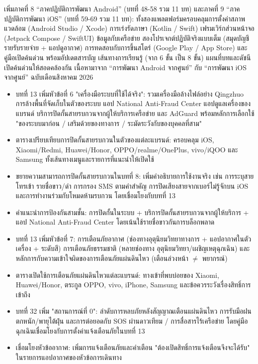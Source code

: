 เพิ่มภาคที่ 8 “ภาคปฏิบัติการพัฒนา Android” (บทที่ 48-58 รวม 11 บท) และภาคที่ 9 “ภาคปฏิบัติการพัฒนา iOS” (บทที่ 59-69 รวม 11 บท): ทั้งสองแพลตฟอร์มครอบคลุมการตั้งค่าสภาพแวดล้อม (Android Studio / Xcode) การเร่งรัดภาษา (Kotlin / Swift) เฟรมเวิร์กส่วนหน้าจอ (Jetpack Compose / SwiftUI) ข้อมูลกับเครือข่าย สองโปรเจกต์ปฏิบัติจริงแบบเต็ม (สมุดบัญชีรายรับรายจ่าย + แอปดูอากาศ) การทดสอบกับการขึ้นสโตร์ (Google Play / App Store) และคู่มือเปิดค้นด่วน พร้อมอัปเดตสารบัญ เส้นทางการเรียนรู้ (จาก 6 ขั้น เป็น 8 ขั้น) แผนที่บทและดัชนีเปิดค้นด่วนให้สอดคล้องกัน เนื้อหามาจาก “การพัฒนา Android จากศูนย์” กับ “การพัฒนา iOS จากศูนย์” ฉบับเดือนสิงหาคม 2026


\begin{itemize}
  \item บทที่ 13 เพิ่มหัวข้อที่ 6 "เครื่องมือระบบที่ใช้ได้จริง": รวมเครื่องมือล้างไฟล์อย่าง Qingzhuo การล้างพื้นที่จัดเก็บในตัวของระบบ แอป National Anti-Fraud Center แอปดูแลเครื่องของแบรนด์ บริการปิดกั้นสายรบกวนจากผู้ให้บริการเครือข่าย และ AdGuard พร้อมหลักการเลือกใช้ "ของระบบมาก่อน / เสริมด้วยของทางการ / ระมัดระวังกับของบุคคลที่สาม"
  \item ตารางเปรียบเทียบการปิดกั้นสายรบกวนในตัวของแต่ละแบรนด์: ครอบคลุม iOS, Xiaomi/Redmi, Huawei/Honor, OPPO/realme/OnePlus, vivo/iQOO และ Samsung ทั้งเส้นทางเมนูและรายการที่แนะนำให้เปิดใช้
  \item ขยายความสามารถการปิดกั้นสายรบกวนในบทที่ 8: เพิ่มคำอธิบายการใช้งานจริง เช่น การระบุสายโทรเข้า รายชื่อขาว/ดำ การกรอง SMS ตามคำสำคัญ การปิดเสียงสายจากเบอร์ไม่รู้จักบน iOS และการทำงานร่วมกับโหมดห้ามรบกวน โดยเชื่อมโยงกับบทที่ 13
  \item คำแนะนำการป้องกันสามชั้น: การปิดกั้นในระบบ + บริการปิดกั้นสายรบกวนจากผู้ให้บริการ + แอป National Anti-Fraud Center โดยเน้นใช้รายชื่อขาวกันการบล็อกพลาด
\end{itemize}


\begin{itemize}
  \item บทที่ 13 เพิ่มหัวข้อที่ 7: การเตือนภัยอากาศ (ช่องทางอุตุนิยมวิทยาทางการ + แอปอากาศในตัวเครื่อง + ระดับสี) การเตือนภัยธรรมชาติ (หลายช่องทาง อุตุนิยมวิทยา/เผชิญเหตุฉุกเฉิน) และหลักการกับความเข้าใจผิดของการเตือนภัยแผ่นดินไหว (เตือนล่วงหน้า $\neq$ พยากรณ์)
  \item ตารางเปิดใช้การเตือนภัยแผ่นดินไหวแต่ละแบรนด์: ทางเข้าที่พบบ่อยของ Xiaomi, Huawei/Honor, ตระกูล OPPO, vivo, iPhone, Samsung และข้อควรระวังเรื่องสิทธิ์การเข้าถึง
  \item บทที่ 32 เพิ่ม "สถานการณ์ที่ 0": ลำดับการหลบภัยหลังสัญญาณเตือนแผ่นดินไหว การรับมือฝนตกหนัก/พายุไต้ฝุ่น และการต่อยอดกับ SOS ผ่านดาวเทียม / การสื่อสารไร้เครือข่าย โดยคู่มือฉุกเฉินเชื่อมโยงกับการตั้งค่าแจ้งเตือนภัยในบทที่ 13
  \item เชื่อมโยงหัวข้ออากาศ: เพิ่มการแจ้งเตือนภัยและคำเตือน "ต้องเปิดสิทธิ์การแจ้งเตือนจึงจะได้รับ" ในรายการแอปอากาศของหัวข้อการเดินทาง
\end{itemize}

